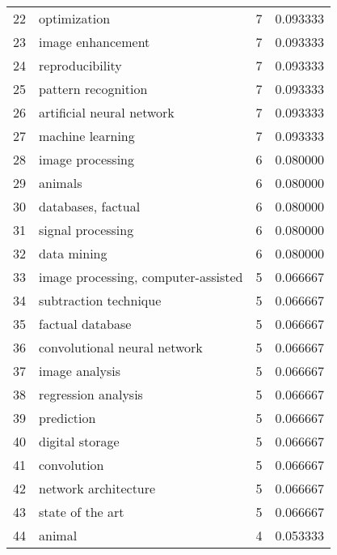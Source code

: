 \begin{tabular}{llrr}
22 &                             optimization &           7 &    0.093333 \\
23 &                        image enhancement &           7 &    0.093333 \\
24 &                          reproducibility &           7 &    0.093333 \\
25 &                      pattern recognition &           7 &    0.093333 \\
26 &                artificial neural network &           7 &    0.093333 \\
27 &                         machine learning &           7 &    0.093333 \\
28 &                         image processing &           6 &    0.080000 \\
29 &                                  animals &           6 &    0.080000 \\
30 &                       databases, factual &           6 &    0.080000 \\
31 &                        signal processing &           6 &    0.080000 \\
32 &                              data mining &           6 &    0.080000 \\
33 &      image processing, computer-assisted &           5 &    0.066667 \\
34 &                    subtraction technique &           5 &    0.066667 \\
35 &                         factual database &           5 &    0.066667 \\
36 &             convolutional neural network &           5 &    0.066667 \\
37 &                           image analysis &           5 &    0.066667 \\
38 &                      regression analysis &           5 &    0.066667 \\
39 &                               prediction &           5 &    0.066667 \\
40 &                          digital storage &           5 &    0.066667 \\
41 &                              convolution &           5 &    0.066667 \\
42 &                     network architecture &           5 &    0.066667 \\
43 &                         state of the art &           5 &    0.066667 \\
44 &                                   animal &           4 &    0.053333 \\

\end{tabular}
